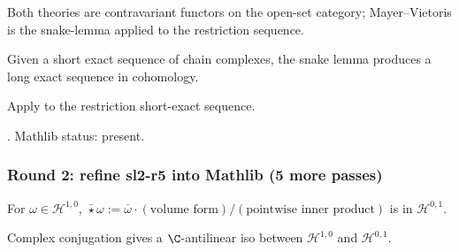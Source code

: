 \begin{lemma}
\label{lem:dmv-r7}
Both theories are contravariant functors on the open-set category; Mayer--Vietoris is the snake-lemma applied to the restriction sequence.
\leanok
\end{lemma}

\begin{lemma}
\label{lem:dmv-r8}
Given a short exact sequence of chain complexes, the snake lemma produces a long exact sequence in cohomology.
\leanok
\end{lemma}

\begin{lemma}
\label{lem:dmv-r9}
Apply  to the restriction short-exact sequence.
\leanok\mathlibok
\end{lemma}

\begin{lemma}
\label{lem:dmv-r10}
.  Mathlib status: present.
\leanok\mathlibok
\end{lemma}

\subsubsection*{Round 2: refine sl2-r5 into Mathlib (5 more passes)}

\begin{lemma}
\label{lem:sl2-r6}
For $\omega \in \mathcal{H}^{1,0}$, $\bar\star\omega := \overline\omega\cdot(\text{volume form})/(\text{pointwise inner product})$ is in $\mathcal{H}^{0,1}$.
\leanok
\end{lemma}

\begin{lemma}
\label{lem:sl2-r7}
Complex conjugation gives a $\C$-antilinear iso between $\mathcal{H}^{1,0}$ and $\mathcal{H}^{0,1}$.
\leanok
\end{lemma}


